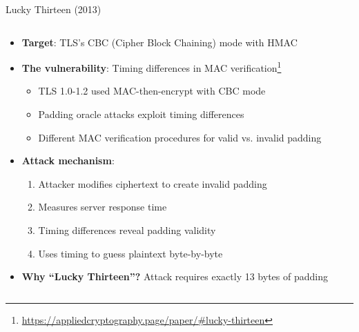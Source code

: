 \documentclass[aspectratio=169, lualatex, handout]{beamer}
\begin{document}
\begin{frame}{Lucky Thirteen (2013)}
	\begin{columns}[c]
		\begin{column}{1\textwidth}
			\begin{itemize}
				\item \textbf{Target}: TLS's CBC (Cipher Block Chaining) mode with HMAC
				\item \textbf{The vulnerability}: Timing differences in MAC verification\footnote{\url{https://appliedcryptography.page/paper/\#lucky-thirteen}}
				      \begin{itemize}
					      \item TLS 1.0-1.2 used MAC-then-encrypt with CBC mode
					      \item Padding oracle attacks exploit timing differences
					      \item Different MAC verification procedures for valid vs. invalid padding
				      \end{itemize}
				\item \textbf{Attack mechanism}:
				      \begin{enumerate}
					      \item Attacker modifies ciphertext to create invalid padding
					      \item Measures server response time
					      \item Timing differences reveal padding validity
					      \item Uses timing to guess plaintext byte-by-byte
				      \end{enumerate}
				\item \textbf{Why ``Lucky Thirteen''?} Attack requires exactly 13 bytes of padding
			\end{itemize}
		\end{column}
	\end{columns}
\end{frame}
\end{document}
